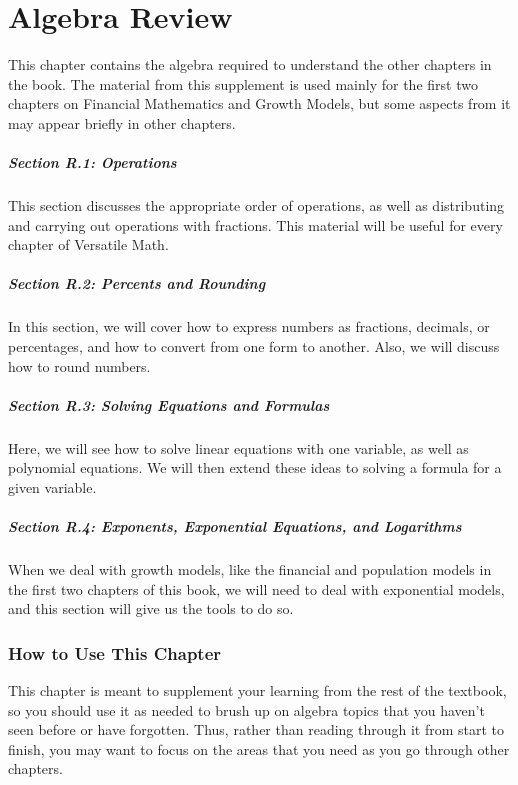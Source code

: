 \documentclass[9pt,letter,twoside,openright]{memoir}
\begin{document}
\pagestyle{algebra}
\setcounter{chapter}{17}%
\renewcommand{\thechapter}{\Alph{chapter}}%
\chapter{Algebra Review}

This chapter contains the algebra required to understand the other chapters in the book.  The material from this supplement is used mainly for the first two chapters on Financial Mathematics and Growth Models, but some aspects from it may appear briefly in other chapters.

\paragraph{Section R.1: Operations} This section discusses the appropriate order of operations, as well as distributing and carrying out operations with fractions.  This material will be useful for every chapter of Versatile Math.
\paragraph{Section R.2: Percents and Rounding} In this section, we will cover how to express numbers as fractions, decimals, or percentages, and how to convert from one form to another.  Also, we will discuss how to round numbers.
\paragraph{Section R.3: Solving Equations and Formulas} Here, we will see how to solve linear equations with one variable, as well as polynomial equations.  We will then extend these ideas to solving a formula for a given variable.
\paragraph{Section R.4: Exponents, Exponential Equations, and Logarithms} When we deal with growth models, like the financial and population models in the first two chapters of this book, we will need to deal with exponential models, and this section will give us the tools to do so.

\subsection{How to Use This Chapter}
This chapter is meant to supplement your learning from the rest of the textbook, so you should use it as needed to brush up on algebra topics that you haven't seen before or have forgotten.  Thus, rather than reading through it from start to finish, you may want to focus on the areas that you need as you go through other chapters.
\end{document}

